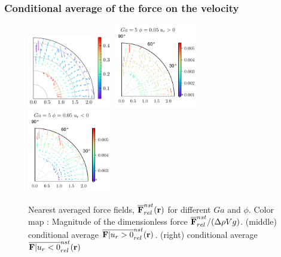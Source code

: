 \documentclass{sintefbeamer}
\begin{document}
\begin{frame}
  \frametitle{Conditional average of the force on the velocity}
  \begin{figure}
    \centering
    \includegraphics[width=0.33\textwidth]{image/HOMOGENEOUS/fDrop/F_mu_r_0_1_Ga_5_PHI_0_05.pdf}
    \includegraphics[width=0.33\textwidth]{image/HOMOGENEOUS/fDrop/Fpos_mu_r_0_1_Ga_5_PHI_0_05.pdf}
    \includegraphics[width=0.33\textwidth]{image/HOMOGENEOUS/fDrop/Fneg_mu_r_0_1_Ga_5_PHI_0_05.pdf}
    \caption{Nearest averaged force fields, $\overline{\textbf{F}}^{nst}_{rel}(\textbf{r})$ for different $Ga$ and $\phi$. 
    Color map : Magnitude of the dimensionless force  $\overline{\textbf{F}}^{nst}_{rel} / (\Delta \rho V g)$.
    (middle) conditional average  $\overline{\textbf{F}| u_r > 0}^{nst}_{rel}(\textbf{r})$. 
    (right) conditional average  $\overline{\textbf{F}| u_r < 0}^{nst}_{rel}(\textbf{r})$ }
  \end{figure}
\end{frame}
\end{document}
